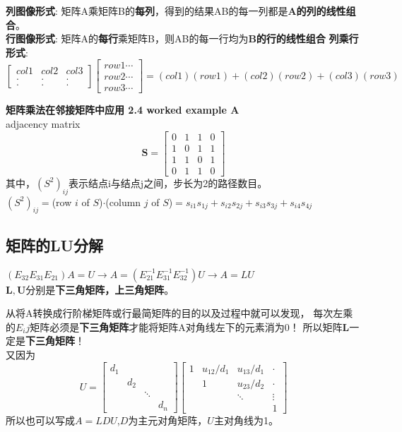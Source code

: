     \textbf{列图像形式}: 矩阵A乘矩阵B的\textbf{每列}，得到的结果AB的每一列都是\textbf{A的列的线性组合}。\\
    \textbf{行图像形式}: 矩阵A的\textbf{每行}乘矩阵B，则AB的每一行均为\textbf{B的行的线性组合}
    \textbf{列乘行形式}:
    $$
    \begin{bmatrix}
        col1 & col2 & col3 \\ . & . & . \\ . & . & .
    \end{bmatrix}
    \begin{bmatrix}
        row1 \cdots \\
        row2 \cdots \\
        row3 \cdots 
    \end{bmatrix}
    = (col1)(row1) + (col2)(row2) + (col3)(row3)
    $$

    \textbf{矩阵乘法在邻接矩阵中应用 2.4 worked example A} \\
    adjacency matrix
    $$
    \bm{S} =
    \begin{bmatrix}
        0 & 1 & 1 & 0\\
        1 & 0 & 1 & 1\\
        1 & 1 & 0 & 1\\
        0 & 1 & 1 & 0
    \end{bmatrix}
    $$
    其中，$(S^2)_{ij}$表示结点i与结点j之间，步长为2的路径数目。\\
    $(S^2)_{ij}=$(row $i$ of $S$)$\cdot$(column $j$ of $S$)$=s_{i1}s_{1j}+s_{i2}s_{2j}+s_{i3}s_{3j}+s_{i4}s_{4j}$

    \subsection{矩阵的LU分解}
    $(E_{32}E_{31}E_{21})A=U \rightarrow A = (E_{21}^{-1}E_{31}^{-1}E_{32}^{-1})U \rightarrow A=LU$
    \\
    $\bm{L, U}$分别是\textbf{下三角矩阵，上三角矩阵}。

    从将A转换成行阶梯矩阵或行最简矩阵的目的以及过程中就可以发现，
    每次左乘的$E_ij$矩阵必须是\textbf{下三角矩阵}才能将矩阵A对角线左下的元素消为0！
    所以矩阵$\bm{L}$一定是\textbf{下三角矩阵}！
    \\
    又因为
    $$
    U=
    \begin{bmatrix}
        d_1 & & &\\
         & d_2 & &\\
         &  & \ddots & \\
         &  & & d_n
    \end{bmatrix}
    \begin{bmatrix}
        1 & u_{12}/d_{1} & u_{13}/d_{1} & \cdot \\
          & 1 & u_{23}/d_2 & \cdot \\
          &   & \ddots & \vdots \\
          &   &   & 1
    \end{bmatrix}
    $$
    所以也可以写成$A=LDU$,$D$为主元对角矩阵，$U$主对角线为1。

